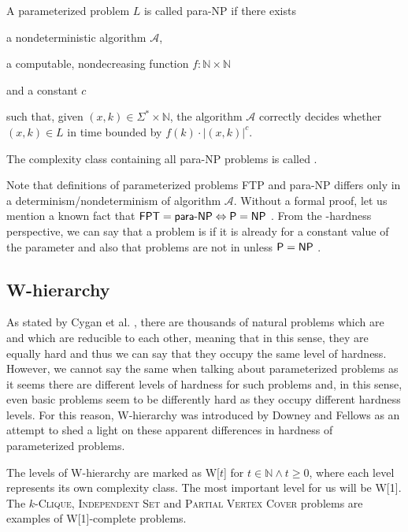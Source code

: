\begin{definition}[para-NP]
    A parameterized problem $L$ is called para-NP if there exists
    \begin{description}
        \item a nondeterministic algorithm $\mathcal{A}$,
        \item a computable, nondecreasing function $f : \mathbb{N} \times \mathbb{N}$
        \item and a constant $c$
    \end{description}
    such that, given $(x,k) \in \Sigma^* \times \mathbb{N}$,
    the algorithm $\mathcal{A}$ correctly decides whether $(x, k) \in L$ in time bounded by
    $f(k) \cdot |(x,k)|^c$.
\end{definition}
The complexity class containing all para-NP problems is called \pNP.

Note that definitions of parameterized problems FTP and para-NP differs only in a determinism/nondeterminism of
algorithm $\mathcal{A}$.
Without a formal proof, let us mention a known fact that $\textsf{FPT} = \textsf{para-NP} \Leftrightarrow \textsf{P} = \textsf{NP}$ \cite[p.~39]{Flum2006}.
From the \pNP-hardness perspective, we can say that a problem is \pNPh if it is \NPh already for a constant value of the parameter
and also that \pNPh problems are not in \XP unless $\textsf{P} = \textsf{NP}$ \cite[p.~41]{Flum2006}. 


\subsection{W-hierarchy}

As stated by Cygan et al. \cite[p.~423]{Cygan2015},
there are thousands of natural problems which are \NPc and which are reducible to each other,
meaning that in this sense, they are equally hard and thus we can say that
they occupy the same level of hardness.
However, we cannot say the same when talking about parameterized problems as it seems there are
different levels of hardness for such problems and, in this sense, even basic problems
seem to be differently hard as they occupy different hardness levels.
For this reason, W-hierarchy was introduced by Downey and Fellows \cite{Downey1999} as
an attempt to shed a light on these apparent differences in hardness of parameterized problems. 

The levels of W-hierarchy are marked as W[$t$] for $t \in \mathbb{N} \wedge t \geq 0$,
where each level represents its own complexity class.
The most important level for us will be W[1].
The $k$-\textsc{Clique}, \textsc{Independent Set} and \textsc{Partial Vertex Cover} problems
are examples of W[1]-complete problems.

